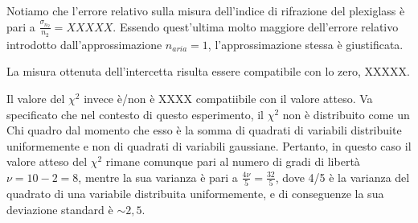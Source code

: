 \documentclass{article}
\begin{document}
	\vspace{1em}
	
Notiamo che l'errore relativo sulla misura dell'indice di rifrazione del plexiglass è pari a $\frac{\sigma_{n_2}}{n_2} = XXXXX$. Essendo quest'ultima molto maggiore dell'errore relativo introdotto dall'approssimazione $n_{aria}=1$, l'approssimazione stessa è giustificata.

La misura ottenuta dell'intercetta risulta essere compatibile con lo zero, XXXXX.

Il valore del $\chi^{2}$ invece è/non è  XXXX compatiibile con il valore atteso. Va specificato che nel contesto di questo esperimento, il $\chi^{2}$ non è distribuito come un Chi quadro dal momento che esso è la somma di quadrati di variabili distribuite uniformemente e non di quadrati di variabili gaussiane. Pertanto, in questo caso il valore atteso del $\chi^{2}$ rimane comunque pari al numero di gradi di libertà $\nu = 10 - 2 = 8$, mentre la sua varianza è pari a $\frac{4\nu}{5}= \frac{32}{5}$, dove 4/5 è la varianza del quadrato di una variabile distribuita uniformemente, e di conseguenze la sua deviazione standard è $\sim 2,5$.
	
\end{document}
